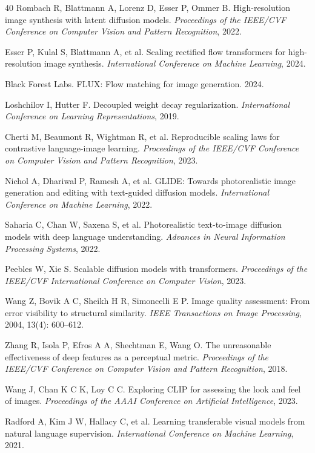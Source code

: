 \documentclass[times,twocolumn,final]{elsarticle}
\providecommand{\DIFadd}[1]{{\protect\color{blue} \sf #1}} %
\providecommand{\DIFaddbegin}{} %
\providecommand{\DIFaddend}{} %
\newcommand{\DIFaddincludegraphics}[2][]{{\color{blue}\fbox{\DIFOincludegraphics[#1]{#2}}}} %
\DeclareRobustCommand{\DIFaddbegin}{\DIFOaddbegin \let\includegraphics\DIFaddincludegraphics} %
\DeclareRobustCommand{\DIFaddend}{\DIFOaddend \let\includegraphics\DIFOincludegraphics} %
\begin{document}
\begin{thebibliography}{40}
Rombach R, Blattmann A, Lorenz D, Esser P, Ommer B. High-resolution image synthesis with latent diffusion models. \textit{Proceedings of the IEEE/CVF Conference on Computer Vision and Pattern Recognition}, 2022.

Esser P, Kulal S, Blattmann A, et al. Scaling rectified flow transformers for high-resolution image synthesis. \textit{International Conference on Machine Learning}, 2024.

Black Forest Labs. FLUX: Flow matching for image generation. 2024.

Loshchilov I, Hutter F. Decoupled weight decay regularization. \textit{International Conference on Learning Representations}, 2019.

Cherti M, Beaumont R, Wightman R, et al. Reproducible scaling laws for contrastive language-image learning. \textit{Proceedings of the IEEE/CVF Conference on Computer Vision and Pattern Recognition}, 2023.

Nichol A, Dhariwal P, Ramesh A, et al. GLIDE: Towards photorealistic image generation and editing with text-guided diffusion models. \textit{International Conference on Machine Learning}, 2022.

Saharia C, Chan W, Saxena S, et al. Photorealistic text-to-image diffusion models with deep language understanding. \textit{Advances in Neural Information Processing Systems}, 2022.

Peebles W, Xie S. Scalable diffusion models with transformers. \textit{Proceedings of the IEEE/CVF International Conference on Computer Vision}, 2023.
\DIFaddbegin 

\DIFadd{Wang Z, Bovik A C, Sheikh H R, Simoncelli E P. Image quality assessment: From error visibility to structural similarity. \textit{IEEE Transactions on Image Processing}, 2004, 13(4): 600--612.
}

\DIFadd{Zhang R, Isola P, Efros A A, Shechtman E, Wang O. The unreasonable effectiveness of deep features as a perceptual metric. \textit{Proceedings of the IEEE/CVF Conference on Computer Vision and Pattern Recognition}, 2018.
}

\DIFadd{Wang J, Chan K C K, Loy C C. Exploring CLIP for assessing the look and feel of images. \textit{Proceedings of the AAAI Conference on Artificial Intelligence}, 2023.
}

\DIFadd{Radford A, Kim J W, Hallacy C, et al. Learning transferable visual models from natural language supervision. \textit{International Conference on Machine Learning}, 2021.
}\DIFaddend 

\end{thebibliography}
\end{document}
